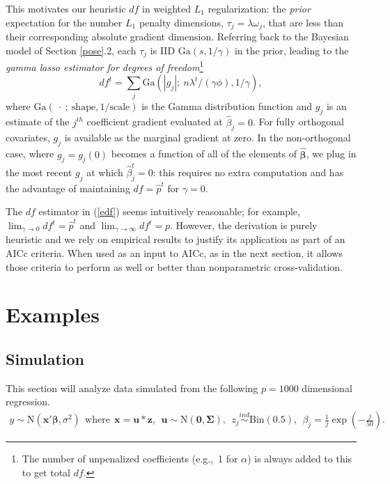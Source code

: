 \documentclass[12pt]{article}
\newcommand{\bs}[1]{\boldsymbol{#1}}
\newcommand{\mr}[1]{\mathrm{#1}}
\newcommand{\bm}[1]{\mathbf{#1}}
\begin{document}
This motivates our heuristic $df$ in weighted $L_1$ regularization:  the {\it prior} expectation for the number  $L_1$ penalty dimensions, $\tau_j = \lambda \omega_j$, that are less than their corresponding absolute gradient dimension.  Referring back to the Bayesian model of Section \ref{pose}.2, each $\tau_j$ is IID $\mr{Ga}(s,1/\gamma)$ in the prior,
leading to the {\it gamma lasso estimator for degrees of freedom}\footnote{The number of unpenalized coefficients (e.g.,~1 for
$\alpha$) is always added to this to get total $df$.} 
\begin{equation}
\label{edf} df^t = \sum_j \mr{Ga}(|g_{j}|;~n\lambda^t/(\gamma\phi),
1/\gamma), \end{equation} where $\mr{Ga}(~\cdot~;~\mr{shape}, 1/\mr{scale})$
is the Gamma distribution function and $g_j$ is an estimate of  the
$j^{th}$ coefficient gradient evaluated at $\hat\beta_j=0$.  For fully orthogonal covariates,  $g_j$ is available as the marginal gradient at zero.
In the non-orthogonal case, where $g_{j} = g_j(0)$ becomes a
function of all of the elements of $\bs{\hat\beta}$, we plug in the most recent
$g_j$ at which $\hat\beta^t_j=0$:  this
requires no extra computation and has the advantage of maintaining $df =
\hat p^t$ for $\gamma = 0$.

The $df$ estimator in (\ref{edf}) seems intuitively reasonable; for example,
$\lim_{\gamma \to 0} df^t = \hat p^t$ and  $\lim_{\gamma \to \infty} df^t= p$.
However, the derivation is purely heuristic and we rely on empirical results to
justify its application as part of an AICc criteria.  When used as an input
to AICc, as in the next section, it allows those criteria to perform as well
or better than nonparametric cross-validation.

\section{Examples}
\label{eg}

\subsection{Simulation}

This section will  analyze data simulated from
 the following $p=1000$ dimensional regression.
\begin{align}
\label{simdgp}
y \sim \mr{N}\left(\bm{x}'\bs{\beta},\sigma^2\right)~~\text{where}~~\bm{x} = \bm{u}*\bm{z},~~\bm{u}\sim \mr{N}\left(\bm{0},\bs{\Sigma}\right),~~z_{j} \stackrel{ind}{\sim} \mr{Bin}(0.5),~~\beta_j = \frac{1}{j}\exp\left(-\frac{j}{50}\right).
\end{align}
\end{document}
